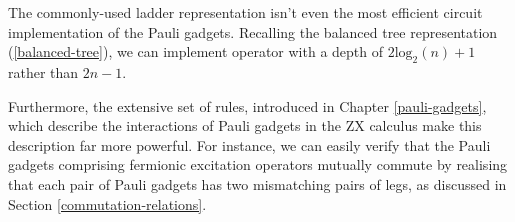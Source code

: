 The commonly-used ladder representation isn't even the most efficient circuit implementation of the Pauli gadgets. Recalling the balanced tree representation (\ref{balanced-tree}), we can implement operator with a depth of $2\text{log}_2(n) + 1$ rather than $2n - 1$.


Furthermore, the extensive set of rules, introduced in Chapter \ref{pauli-gadgets}, which describe the interactions of Pauli gadgets in the ZX calculus make this description far more powerful. For instance, we can easily verify that the Pauli gadgets comprising fermionic excitation operators mutually commute by realising that each pair of Pauli gadgets has two mismatching pairs of legs, as discussed in Section \ref{commutation-relations}.
